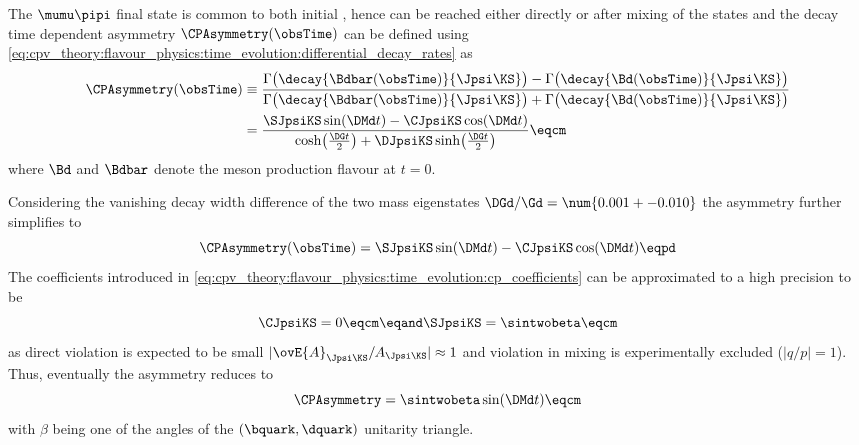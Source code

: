 The $\mumu\pipi$ final state is common to both initial \Bmesons, hence can be
reached either directly or after mixing of the \Bmeson states and the decay time
dependent \CP asymmetry $\CPAsymmetry(\obsTime)$ can be defined using
\cref{eq:cpv_theory:flavour_physics:time_evolution:differential_decay_rates} as
%
\begin{equation}\label{eq:cpv_theory:bd2jpsiks:cp_asymmetry}
  \begin{split}
    \CPAsymmetry(\obsTime) &\equiv 
      \frac{\Gamma\bigl(\decay{\Bdbar(\obsTime)}{\Jpsi\KS}\bigr) - \Gamma\bigl(\decay{\Bd(\obsTime)}{\Jpsi\KS}\bigr)}
           {\Gamma\bigl(\decay{\Bdbar(\obsTime)}{\Jpsi\KS}\bigr) + \Gamma\bigl(\decay{\Bd(\obsTime)}{\Jpsi\KS}\bigr)} \\
                 &= \frac{\SJpsiKS\sin(\DMd t) - \CJpsiKS\cos(\DMd t)}{\cosh\bigl(\frac{\DG t}{2}\bigr) + \DJpsiKS\sinh\bigl(\frac{\DG t}{2}\bigr)} \eqcm
  \end{split}
\end{equation}
%
where $\Bd$ and $\Bdbar$ denote the meson production flavour at $t=0$.

Considering the vanishing decay width difference of the two mass eigenstates
$\DGd/\Gd = \num{0.001 +- 0.010}$ \cite{Amhis:2014hma} the \CP asymmetry further
simplifies to
%
\begin{equation}\label{eq:cpv_theory:bd2jpsiks:cp_asymmetry:simplified}
  \CPAsymmetry(\obsTime) = \SJpsiKS\sin(\DMd t) - \CJpsiKS\cos(\DMd t) \eqpd
\end{equation}
%
The \CP coefficients introduced in
\cref{eq:cpv_theory:flavour_physics:time_evolution:cp_coefficients} can be
approximated to a high precision to be
%
\begin{equation}
  \CJpsiKS = 0           \eqcm\eqand 
  \SJpsiKS = \sintwobeta \eqcm
\end{equation}
%
as direct \CP violation is expected to be small
$\vert\ovE{A}_{\Jpsi\KS}/A_{\Jpsi\KS}\vert\approx 1$ and \CP violation in mixing
is experimentally excluded ($\vert q/p \vert = 1$). Thus, eventually the \CP
asymmetry reduces to
%
\begin{equation}
  \CPAsymmetry = \sintwobeta\sin(\DMd t) \eqcm
\end{equation}
%
with $\beta$ being one of the angles of the ${(\bquark,\dquark)}$ unitarity
triangle.

